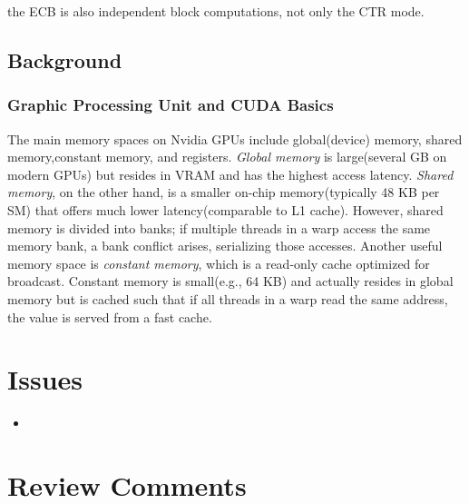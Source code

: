 \documentclass[a4paper]{article}
\begin{document}
\begin{note}
  the ECB is also independent block computations, not only the CTR mode.
\end{note}

\subsection{Background}

\subsubsection{Graphic Processing Unit and CUDA Basics}

The main memory spaces on Nvidia GPUs include global(device) memory, shared memory,constant memory, and registers. \textit{Global memory} is large(several GB on modern GPUs) but resides in VRAM and has the highest access latency. \textit{Shared memory}, on the other hand, is a smaller on-chip memory(typically 48 KB per SM) that offers much lower latency(comparable to L1 cache). However, shared memory is divided into banks; if multiple threads in a warp access the same memory bank, a bank conflict arises, serializing those accesses. Another useful memory space is \textit{constant memory}, which is a read-only cache optimized for broadcast. Constant memory is small(e.g., 64 KB) and actually resides in global memory but is cached such that if all threads in a warp read the same address, the value is served from a fast cache.

\section{Issues}

\begin{itemize}
  \item
\end{itemize}

\section{Review Comments}

% 
\end{document}
